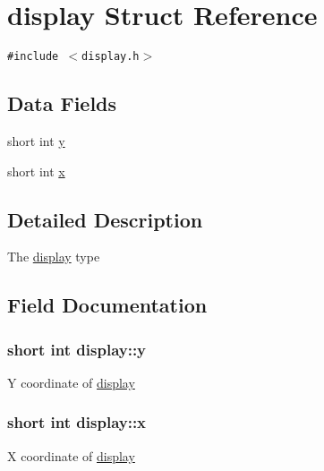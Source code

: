 \hypertarget{structdisplay}{
\section{display Struct Reference}
\label{structdisplay}
}
{\tt \#include $<$display.h$>$}

\subsection*{Data Fields}
\begin{CompactItemize}
\item 
short int \hyperlink{structdisplay_0ab653a2199638318a2dbbee08062b9c}{y}
\item 
short int \hyperlink{structdisplay_14574f1784d84b7aa04d8a3d83ed2b72}{x}
\end{CompactItemize}


\subsection{Detailed Description}
The \hyperlink{structdisplay}{display} type 

\subsection{Field Documentation}
\hypertarget{structdisplay_0ab653a2199638318a2dbbee08062b9c}{
\subsubsection{\setlength{\rightskip}{0pt plus 5cm}short int {\bf display::y}}}
\label{structdisplay_0ab653a2199638318a2dbbee08062b9c}


Y coordinate of \hyperlink{structdisplay}{display} \hypertarget{structdisplay_14574f1784d84b7aa04d8a3d83ed2b72}{
\subsubsection{\setlength{\rightskip}{0pt plus 5cm}short int {\bf display::x}}}
\label{structdisplay_14574f1784d84b7aa04d8a3d83ed2b72}


X coordinate of \hyperlink{structdisplay}{display} 